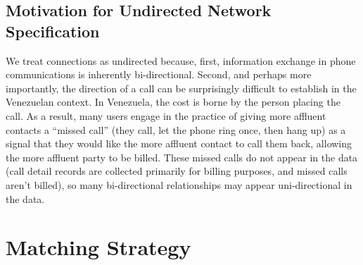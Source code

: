 \documentclass[12pt]{article}
\begin{document}
\subsection{Motivation for Undirected Network Specification}


We treat connections as undirected because, first, information exchange in phone communications is inherently bi-directional. Second, and perhaps more importantly, the direction of a call can be surprisingly difficult to establish in the Venezuelan context. In Venezuela, the cost is borne by the person placing the call. As a result, many users engage in the practice of giving more affluent contacts a ``missed call'' (they call, let the phone ring once, then hang up) as a signal that they would like the more affluent contact to call them back, allowing the more affluent party to be billed. These missed calls do not appear in the data (call detail records are collected primarily for billing purposes, and missed calls aren't billed), so many bi-directional relationships may appear uni-directional in the data.












\section{Matching Strategy}\label{appendix_matching}
\end{document}
